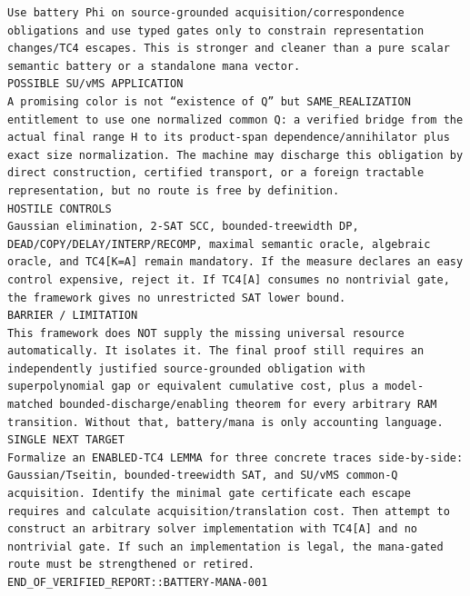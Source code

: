\documentclass[11pt]{article}
\begin{document}
\begin{Verbatim}[breaklines=true,breakanywhere=true]
Use battery Phi on source-grounded acquisition/correspondence obligations and use typed gates only to constrain representation changes/TC4 escapes. This is stronger and cleaner than a pure scalar semantic battery or a standalone mana vector.
POSSIBLE SU/vMS APPLICATION
A promising color is not “existence of Q” but SAME_REALIZATION entitlement to use one normalized common Q: a verified bridge from the actual final range H to its product-span dependence/annihilator plus exact size normalization. The machine may discharge this obligation by direct construction, certified transport, or a foreign tractable representation, but no route is free by definition.
HOSTILE CONTROLS
Gaussian elimination, 2-SAT SCC, bounded-treewidth DP, DEAD/COPY/DELAY/INTERP/RECOMP, maximal semantic oracle, algebraic oracle, and TC4[K=A] remain mandatory. If the measure declares an easy control expensive, reject it. If TC4[A] consumes no nontrivial gate, the framework gives no unrestricted SAT lower bound.
BARRIER / LIMITATION
This framework does NOT supply the missing universal resource automatically. It isolates it. The final proof still requires an independently justified source-grounded obligation with superpolynomial gap or equivalent cumulative cost, plus a model-matched bounded-discharge/enabling theorem for every arbitrary RAM transition. Without that, battery/mana is only accounting language.
SINGLE NEXT TARGET
Formalize an ENABLED-TC4 LEMMA for three concrete traces side-by-side: Gaussian/Tseitin, bounded-treewidth SAT, and SU/vMS common-Q acquisition. Identify the minimal gate certificate each escape requires and calculate acquisition/translation cost. Then attempt to construct an arbitrary solver implementation with TC4[A] and no nontrivial gate. If such an implementation is legal, the mana-gated route must be strengthened or retired.
END_OF_VERIFIED_REPORT::BATTERY-MANA-001
\end{Verbatim}
\end{document}
